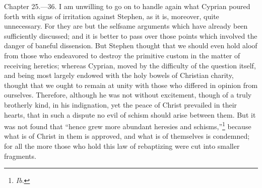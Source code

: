 
Chapter 25.—36. I am unwilling to go on to handle again what Cyprian poured forth with signs of irritation against Stephen, as it is, moreover, quite unnecessary. For they are but the selfsame arguments which have already been sufficiently discussed; and it is better to pass over those points which involved the danger of baneful dissension. But Stephen thought that we should even hold aloof from those who endeavored to destroy the primitive custom in the matter of receiving heretics; whereas Cyprian, moved by the difficulty of the question itself, and being most largely endowed with the holy bowels of Christian charity, thought that we ought to remain at unity with those who differed in opinion from ourselves. Therefore, although he was not without excitement, though of a truly brotherly kind, in his indignation, yet the peace of Christ prevailed in their hearts, that in such a dispute no evil of schism should arise between them. But it was not found that ``hence grew more abundant heresies and schisms,''\footnote{\par  \emph{Ib}.} because what is of Christ in them is approved, and what is of themselves is condemned; for all the more those who hold this law of rebaptizing were cut into smaller fragments.


